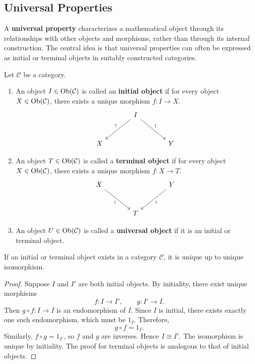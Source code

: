 \subsection{Universal Properties}

  A \textbf{universal property} characterizes a mathematical object through its relationships with other objects and morphisms, rather than through its internal construction. The central idea is that universal properties can often be expressed as initial or terminal objects in suitably constructed categories.

  \begin{definition}
    \label{def:initial-terminal-and-universal-objects}
    Let $\mathcal C$ be a category. 
		\begin{enumerate}
		  \item An object $I \in \operatorname{Ob}(\mathcal C)$ is called an \textbf{initial object} if for every object $X \in \operatorname{Ob}(\mathcal C)$, there exists a unique morphism $f: I \to X$. 
				\begin{equation}
					\begin{tikzcd}[column sep=large, row sep=large]
						& I \arrow[dl, "!"'] \arrow[dr, "!"] & \\
						X & & Y
					\end{tikzcd}
				\end{equation}

			\item An object $T \in \operatorname{Ob}(\mathcal C)$ is called a \textbf{terminal object} if for every object $X \in \operatorname{Ob}(\mathcal C)$, there exists a unique morphism $f: X \to T$. 
				\begin{equation}
					\begin{tikzcd}[column sep=large, row sep=large]
						X \arrow[dr, "!"'] & & Y \arrow[dl, "!"] \\
						& T &
					\end{tikzcd}
				\end{equation}
				
			\item An object $U \in \operatorname{Ob}(\mathcal{C})$ is called a \textbf{universal object} if it is an initial or terminal object. 
		\end{enumerate}
		If an initial or terminal object exists in a category $\mathcal{C}$, it is unique up to unique isomorphism. 
  \end{definition}
  \begin{proof}
    Suppose $I$ and $I'$ are both initial objects. By initiality, there exist unique morphisms
    \begin{equation}
      f: I \to I', \qquad g: I' \to I.
    \end{equation}
    Then $g \circ f: I \to I$ is an endomorphism of $I$. Since $I$ is initial, there exists exactly one such endomorphism, which must be $1_I$. Therefore,
    \begin{equation}
      g \circ f = 1_I.
    \end{equation}
    Similarly, $f \circ g = 1_{I'}$, so $f$ and $g$ are inverses. Hence $I \cong I'$. The isomorphism is unique by initiality. The proof for terminal objects is analogous to that of initial objects. 
  \end{proof}

